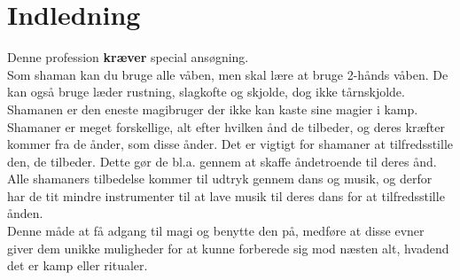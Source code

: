 
\chapter*{Indledning}

Denne profession \textbf{kræver} special ansøgning.\\

Som shaman kan du bruge alle våben, men skal lære at bruge 2-hånds våben. De kan også bruge læder rustning, slagkofte og skjolde, dog ikke tårnskjolde. Shamanen er den eneste magibruger der ikke kan kaste sine magier i kamp.\\

Shamaner er meget forskellige, alt efter hvilken ånd de tilbeder, og deres kræfter kommer fra de ånder, som disse ånder. Det er vigtigt for shamaner at tilfredsstille den, de tilbeder. Dette gør de bl.a. gennem at skaffe åndetroende til deres ånd. Alle shamaners tilbedelse kommer til udtryk gennem dans og musik, og derfor har de tit mindre instrumenter til at lave musik til deres dans for at tilfredsstille ånden.\\
Denne måde at få adgang til magi og benytte den på, medføre at disse evner giver dem unikke muligheder for at kunne forberede sig mod næsten alt, hvadend det er kamp eller ritualer. 